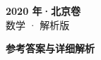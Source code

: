 \documentclass[zihao=-4, a4paper]{ctexart}
\begin{document}
\begin{center}
  {\Large\bfseries 2020 年·北京卷}\\[4pt]
  {\large 数学 · 解析版}
\end{center}
\medskip
{}

\clearpage
{}
\begin{center}{\Large\bfseries 参考答案与详细解析}\end{center}
\medskip

\end{document}
